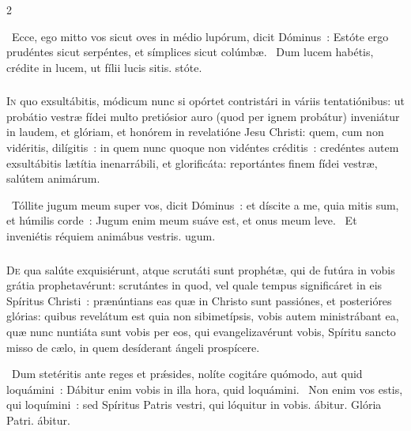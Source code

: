 \documentclass[9pt,twoside]{extarticle}
\begin{document}
\begin{multicols}{2}
{{{\begin{tightlist}{}
\item {}~Ecce, ego mitto vos sicut oves in médio lupórum, dicit Dóminus~: \textred{*} Estóte ergo prudéntes sicut serpéntes, et símplices sicut colúmbæ. ~Dum lucem habétis, crédite in lucem, ut fílii lucis sitis. stóte.
\end{tightlist}

\subsubsection*{\center {}}
\lettrine{I}n quo exsultábitis, módicum nunc si opórtet contristári in váriis tentatiónibus:
ut probátio vestræ fídei multo pretiósior auro (quod per ignem probátur) inveniátur in laudem, et glóriam, et honórem in revelatióne Jesu Christi:
quem, cum non vidéritis, dilígitis~: in quem nunc quoque non vidéntes créditis~: credéntes autem exsultábitis lætítia inenarrábili, et glorificáta:
reportántes finem fídei vestræ, salútem animárum.

\begin{tightlist}{}
\item {}~Tóllite jugum meum super vos, dicit Dóminus~: et díscite a me, quia mitis sum, et húmilis corde~: \textred{*} Jugum enim meum suáve est, et onus meum leve. ~Et inveniétis réquiem animábus vestris. ugum.
\end{tightlist}

\subsubsection*{\center {}}
\lettrine{D}e qua salúte exquisiérunt, atque scrutáti sunt prophétæ, qui de futúra in vobis grátia prophetavérunt:
scrutántes in quod, vel quale tempus significáret in eis Spíritus Christi~: prænúntians eas quæ in Christo sunt passiónes, et posterióres glórias:
quibus revelátum est quia non sibimetípsis, vobis autem ministrábant ea, quæ nunc nuntiáta sunt vobis per eos, qui evangelizavérunt vobis, Spíritu sancto misso de cælo, in quem desíderant ángeli prospícere.

\begin{tightlist}{}
\item {}~Dum stetéritis ante reges et prǽsides, nolíte cogitáre quómodo, aut quid loquámini~: \textred{*} Dábitur enim vobis in illa hora, quid loquámini. ~Non enim vos estis, qui loquímini~: sed Spíritus Patris vestri, qui lóquitur in vobis. ábitur. Glória Patri. ábitur.
\end{tightlist}

}}}
\end{multicols}
\end{document}
